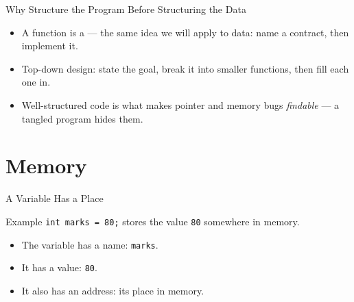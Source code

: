 \documentclass[aspectratio=169]{beamer}
\begin{document}
\begin{frame}{Why Structure the Program Before Structuring the Data}
  \begin{itemize}
    \item A function is a  --- the same idea we
      will apply to data: name a contract, then implement it.
    \item Top-down design: state the goal, break it into smaller functions,
      then fill each one in.
    \item Well-structured code is what makes pointer and memory bugs
      \emph{findable} --- a tangled program hides them.
  \end{itemize}
  \vspace{0.15cm}
\end{frame}


\section{Memory}


\begin{frame}{A Variable Has a Place}
  \begin{block}{Example}
    \texttt{int marks = 80;} stores the value \texttt{80} somewhere in memory.
  \end{block}
  \begin{itemize}
    \item The variable has a name: \texttt{marks}.
    \item It has a value: \texttt{80}.
    \item It also has an address: its place in memory.
  \end{itemize}
\end{frame}
\end{document}
